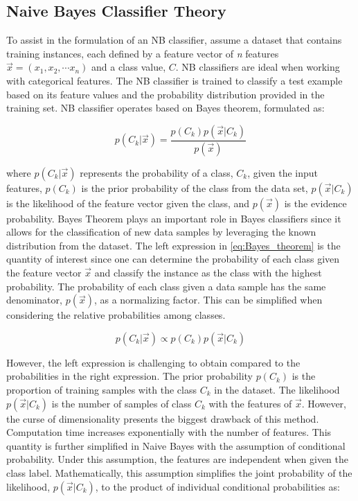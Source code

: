 \documentclass[a4paper]{article}
\begin{document}
\subsection{Naive Bayes Classifier Theory}

To assist in the formulation of an NB classifier, assume a dataset that contains training instances, each defined by a feature vector of \textit{n} features $\vec{x}=(x_1, x_2, \cdots x_n)$ and a class value, $C$. NB classifiers are ideal when working with categorical features. The NB classifier is trained to classify a test example based on its feature values and the probability distribution provided in the training set. NB classifier operates based on Bayes theorem, formulated as:

\begin{equation} \label{eq:Bayes_theorem}
    p(C_k|\vec{x}) = \frac{p(C_k)p(\vec{x}|C_k)}{p(\vec{x})}
\end{equation}

where $p(C_k|\vec x)$ represents the probability of a class, $C_k$, given the input features, $p(C_k)$ is the prior probability of the class from the data set, $p(\vec x|C_k)$ is the likelihood of the feature vector given the class, and $p(\vec x)$ is the evidence probability. Bayes Theorem plays an important role in Bayes classifiers since it allows for the classification of new data samples by leveraging the known distribution from the dataset. The left expression in \cref{eq:Bayes_theorem} is the quantity of interest since one can determine the probability of each class given the feature vector $\vec {x}$ and classify the instance as the class with the highest probability. The probability of each class given a data sample has the same denominator, $p(\vec x)$, as a normalizing factor. This can be simplified when considering the relative probabilities among classes.

\begin{equation} \label{eq:Bayes_theorem_simplified}
    p(C_k|\vec{x}) \propto p(C_k)p(\vec{x}|C_k)
\end{equation}

However, the left expression is challenging to obtain compared to the probabilities in the right expression. The prior probability $p(C_k)$ is the proportion of training samples with the class $C_k$ in the dataset. The likelihood $p(\vec x|C_k)$ is the number of samples of class $C_k$ with the features of $\vec x$. However, the curse of dimensionality presents the biggest drawback of this method. Computation time increases exponentially with the number of features. This quantity is further simplified in Naive Bayes with the assumption of conditional probability. Under this assumption, the features are independent when given the class label. Mathematically, this assumption simplifies the joint probability of the likelihood, $p(\vec x|C_k)$, to the product of individual conditional probabilities as:
\end{document}
